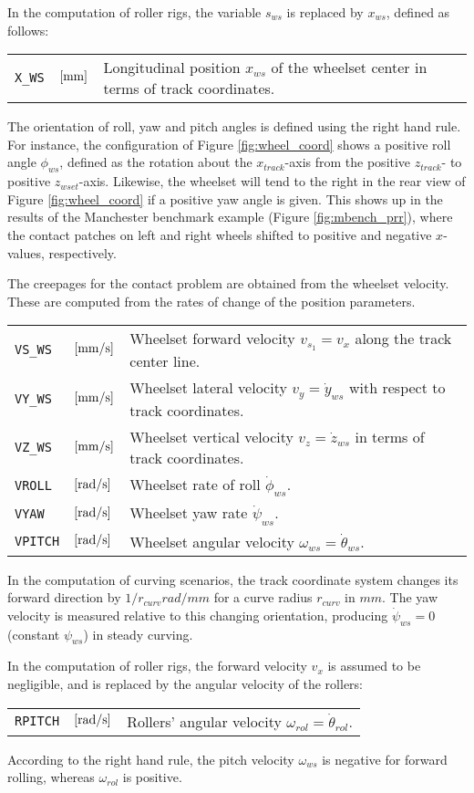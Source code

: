 \documentclass[12pt]{report}
\renewcommand{\magenta}[1]{}
\newenvironment{inputvars}{\vspace{0.4\baselineskip}%

\begin{tabular}{>{\raggedright}p{22mm}p{19mm}p{113mm}}}{
\end{tabular}

}
\newcommand{\inpvar}[3]{{\small\tt #1} & $#2$ & #3 \\[1ex]}
\begin{document}
In the computation of roller rigs, the variable $s_{ws}$ is replaced by
$x_{ws}$, defined as follows:
\begin{inputvars}
\inpvar{X\_WS}{\bunit{mm}}{Longitudinal position $x_{ws}$ of the wheelset
        center in terms of track coordinates.}
\end{inputvars}
The orientation of roll, yaw and pitch angles is defined using the right
hand rule. For instance, the configuration of Figure \ref{fig:wheel_coord}
shows a positive roll angle $\phi_{ws}$, defined as the rotation about the
$x_{track}$-axis from the positive $z_{track}$- to positive $z_{wset}$-axis.
Likewise, the wheelset will tend to the right in the rear view of Figure
\ref{fig:wheel_coord} if a positive yaw angle is given. This shows up in
the results of the Manchester benchmark example (Figure
\ref{fig:mbench_prr}), where the contact patches on left and right wheels
shifted to positive and negative $x$-values, respectively.

The creepages for the contact problem are obtained from the wheelset
velocity. These are computed from the rates of change of the position
parameters.

\magenta{Extensions for ${\tt F}_1=1\text{--}2$ are under development,
prescribing $F_{x(ws)}$ or $M_{y(ws)}$ (on the rail!) instead of
$\omega_{ws}$. These are targeted mainly at small (relative) forces,
little precautions are taken to prevent solver divergence.}
\begin{inputvars}
\inpvar{VS\_WS}{\bunit{mm/s}}{Wheelset forward velocity $v_{s_1}=v_x$ along
        the track center line.}
\inpvar{VY\_WS}{\bunit{mm/s}}{Wheelset lateral velocity $v_y=\dot{y}_{ws}$ with
        respect to track coordinates.}
\inpvar{VZ\_WS}{\bunit{mm/s}}{Wheelset vertical velocity $v_z=\dot{z}_{ws}$ 
        in terms of track coor\-di\-nates.}
\inpvar{VROLL}{\bunit{rad/s}}{Wheelset rate of roll $\dot{\phi}_{ws}$.}
\inpvar{VYAW}{\bunit{rad/s}}{Wheelset yaw rate $\dot{\psi}_{ws}$.}
\inpvar{VPITCH}{\bunit{rad/s}}{Wheelset angular velocity $\omega_{ws}=
        \dot{\theta}_{ws}$. \magenta{Output when ${\tt F}_1=1$ or $2$.}}
\end{inputvars}
In the computation of curving scenarios, the track coordinate system
changes its forward direction by $1/r_{curv}\unit{rad/mm}$ for a curve
radius $r_{curv}$ in $\unit{mm}$. The yaw velocity is measured relative to
this changing orientation, producing $\dot{\psi}_{ws}=0$ (constant
$\psi_{ws}$) in steady curving.

In the computation of roller rigs, the forward velocity $v_x$ is assumed to
be negligible, and is replaced by the angular velocity of the rollers:
\begin{inputvars}
\inpvar{RPITCH}{\bunit{rad/s}}{Rollers' angular velocity $\omega_{rol}=
        \dot{\theta}_{rol}$.}
\end{inputvars}
According to the right hand rule, the pitch velocity $\omega_{ws}$ is
negative for forward rolling, whereas $\omega_{rol}$ is positive.
\end{document}
